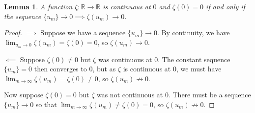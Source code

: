\documentclass{article}
\newcommand{\reals}{\mathbb{R}}
\newtheorem{lemma}{Lemma}
\begin{document}
\begin{lemma}\label{lem:continuous-iff-limits}
	A function $\zeta:\reals \to \reals$ is continuous at $0$ and $\zeta(0) = 0$ if and only if the sequence $\{u_m\} \to 0 \implies \zeta(u_m) \to 0$.
\end{lemma}
\begin{proof}
	$\implies$ Suppose we have a sequence $\{u_m\} \to 0$.
	By continuity, we have $\lim_{u_m \to 0}\zeta(u_m) = \zeta(0) = 0$, so $\zeta(u_m) \to 0$.
	
	$\impliedby$ Suppose $\zeta(0) \neq 0$ but $\zeta$ was continuous at $0$.
	The constant sequence $\{u_m\} = 0$ then converges to $0$, but as $\zeta$ is continuous at $0$, we must have $\lim_{m \to \infty}\zeta(u_m) = \zeta(0) \neq 0$, so $\zeta(u_m) \not \to 0$.
	
	Now suppose $\zeta(0) = 0$ but $\zeta$ was not continuous at $0$.
	There must be a sequence $\{u_m\} \to 0$ so that $\lim_{m \to \infty}\zeta(u_m) \neq \zeta(0) = 0$, so $\zeta(u_m) \not \to 0$.
\end{proof}
\end{document}
